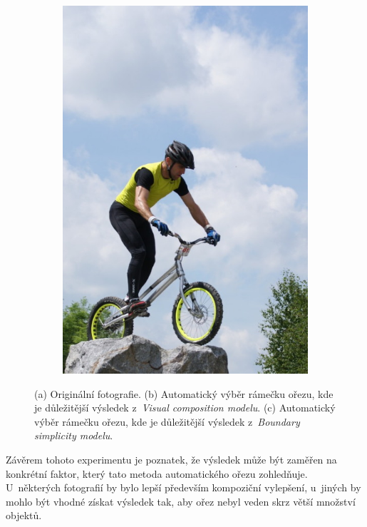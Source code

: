 \begin{figure}[H]
\begin{subfigure}{0.31\textwidth}
      \includegraphics[scale=1.0]{obrazky/cropFang_Bc.jpg}
      \caption{}
      \label{obr:weightsC}
    \end{subfigure}
    
\caption{(a) Originální fotografie. (b) Automatický výběr rámečku ořezu, kde je důležitější výsledek z~\emph{Visual composition modelu}. (c) Automatický výběr rámečku ořezu, kde je důležitější výsledek z~\emph{Boundary simplicity modelu}.}
\label{obr:weights}
\end{figure}

Závěrem tohoto experimentu je poznatek, že výsledek může být zaměřen na konkrétní faktor, který tato metoda automatického ořezu zohledňuje. U~některých fotografií by bylo lepší především kompoziční vylepšení, u~jiných by mohlo být vhodné získat výsledek tak, aby ořez nebyl veden skrz větší množství objektů.

